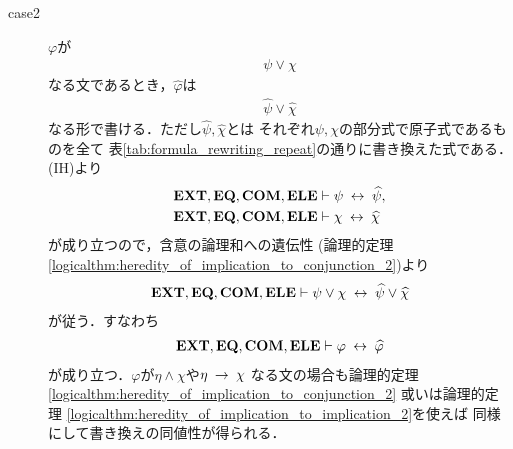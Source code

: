 \begin{sketch}
\begin{description}
\begin{description}
\begin{description}
							\item[case2] $\varphi$が
								\begin{align}
									\psi \vee \chi
								\end{align}
								なる文であるとき，$\widehat{\varphi}$は
								\begin{align}
									\widehat{\psi} \vee \widehat{\chi}
								\end{align}
								なる形で書ける．ただし$\widehat{\psi},\widehat{\chi}$とは
								それぞれ$\psi,\chi$の部分式で原子式であるものを全て
								表\ref{tab:formula_rewriting_repeat}の通りに書き換えた式である．
								(IH)より
								\begin{align}
									\mbox{{\bf EXT}},\mbox{{\bf EQ}},\mbox{\bf COM},\mbox{{\bf ELE}} &\vdash \psi \hspace{0.25em}\leftrightarrow\hspace{0.25em} \widehat{\psi}, \\
									\mbox{{\bf EXT}},\mbox{{\bf EQ}},\mbox{\bf COM},\mbox{{\bf ELE}} &\vdash \chi \hspace{0.25em}\leftrightarrow\hspace{0.25em} \widehat{\chi}
								\end{align}
								が成り立つので，含意の論理和への遺伝性
								(論理的定理\ref{logicalthm:heredity_of_implication_to_conjunction_2})より
								\begin{align}
									\mbox{{\bf EXT}},\mbox{{\bf EQ}},\mbox{\bf COM},\mbox{{\bf ELE}} \vdash \psi \vee \chi 
									\hspace{0.25em}\leftrightarrow\hspace{0.25em} \widehat{\psi} \vee \widehat{\chi}
								\end{align}
								が従う．すなわち
								\begin{align}
									\mbox{{\bf EXT}},\mbox{{\bf EQ}},\mbox{\bf COM},\mbox{{\bf ELE}} \vdash \varphi \hspace{0.25em}\leftrightarrow\hspace{0.25em} \widehat{\varphi}
								\end{align}
								が成り立つ．$\varphi$が$\eta \wedge \chi$や$\eta \hspace{0.25em}\rightarrow\hspace{0.25em} \chi$
								なる文の場合も論理的定理
								\ref{logicalthm:heredity_of_implication_to_conjunction_2}
								或いは論理的定理
								\ref{logicalthm:heredity_of_implication_to_implication_2}を使えば
								同様にして書き換えの同値性が得られる．
								

\end{description}
\end{description}
\end{description}
\end{sketch}
